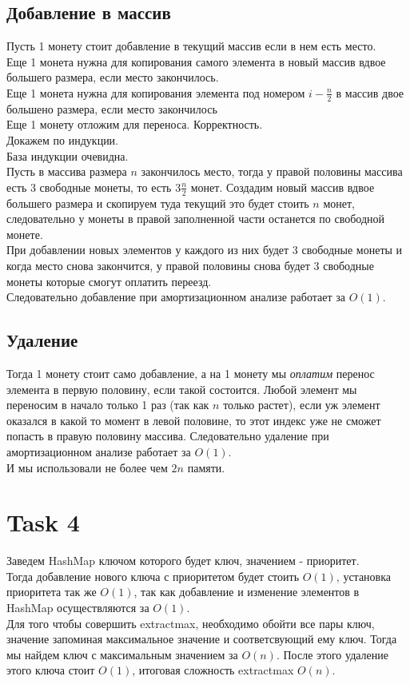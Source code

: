 \documentclass[12pt]{exam}
\begin{document}
\subsection*{Добавление в массив}
Пусть 1 монету стоит добавление в текущий массив если в нем есть место.\\
Еще 1 монета нужна для копирования самого элемента в новый массив вдвое большего размера, если место закончилось. \\
Еще 1 монета нужна для копирования элемента под номером $i - \frac{n}{2}$ в массив двое большено размера, если место закончилось\\
Еще 1 монету отложим для переноса.
Корректность.\\
Докажем по индукции.\\
База индукции очевидна.\\
Пусть в массива размера $n$ закончилось место, тогда у правой половины массива есть 3 свободные монеты, 
то есть $3 \frac{n}{2}$ монет.
Создадим новый массив вдвое большего размера и скопируем туда текущий это будет стоить $n$ монет,
следовательно у монеты в правой заполненной части останется по свободной монете. \\
При добавлении новых элементов у каждого из них будет 3 свободные монеты и когда место снова закончится, 
у правой половины снова будет 3 свободные монеты которые смогут оплатить переезд.\\
Следовательно добавление при амортизационном анализе работает за $O(1)$.
\subsection*{Удаление}
Тогда 1 монету стоит само добавление, а на 1 монету мы \textit{оплатим} перенос элемента в первую половину, 
если такой состоится. Любой элемент мы переносим в начало только 1 раз 
(так как $n$ только растет), если уж элемент оказался в какой то момент в левой половине, 
то этот индекс уже не сможет попасть в правую половину массива.
Следовательно удаление при амортизационном анализе работает за $O(1)$.\\
И мы использовали не более чем $2n$ памяти.

\section*{Task 4}
Заведем HashMap ключом которого будет ключ, значением - приоритет. \\
Тогда добавление нового ключа с приоритетом будет стоить $O(1)$, 
установка приоритета так же $O(1)$, так как добавление и изменение элементов в HashMap 
осуществляются за $O(1)$. \\
Для того чтобы совершить extractmax, необходимо обойти все пары ключ, значение 
запоминая максимальное значение и соответсвующий ему ключ. 
Тогда мы найдем ключ с максимальным значением за $O(n)$. 
После этого удаление этого ключа стоит $O(1)$, итоговая сложность extractmax $O(n)$.
\end{document}
